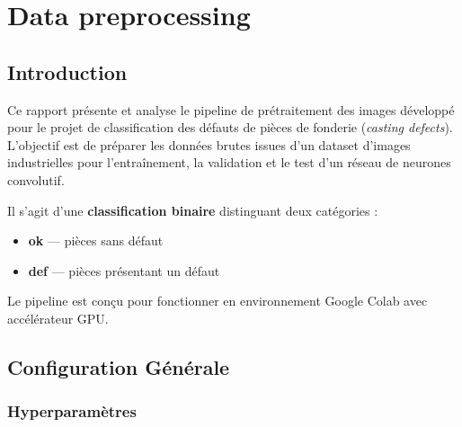 
\chapter{Data preprocessing}
\section{Introduction}

\pagestyle{fancy}
\fancyhf{}
\fancyfoot[C]{\thepage}
\renewcommand{\headrulewidth}{0.4pt}

Ce rapport présente et analyse le pipeline de prétraitement des images développé pour le projet de classification des défauts de pièces de fonderie (\textit{casting defects}). L'objectif est de préparer les données brutes issues d'un dataset d'images industrielles pour l'entraînement, la validation et le test d'un réseau de neurones convolutif.

\begin{infobox}
  Il s'agit d'une \textbf{classification binaire} distinguant deux catégories :
  \begin{itemize}[noitemsep]
    \item \textcolor{ok}{\textbf{ok}} — pièces sans défaut
    \item \textcolor{defect}{\textbf{def}} — pièces présentant un défaut
  \end{itemize}
  Le pipeline est conçu pour fonctionner en environnement Google Colab avec accélérateur GPU.
\end{infobox}

\section{Configuration Générale}

\subsection{Hyperparamètres}

